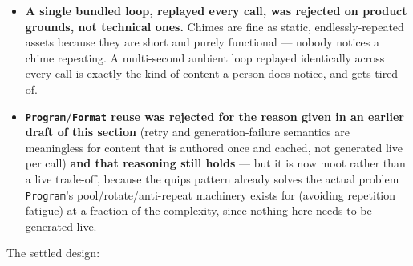 \documentclass[a4paper,11pt]{report}
\begin{document}
\begin{itemize}
  \item \textbf{A single bundled loop, replayed every call, was rejected
    on product grounds, not technical ones.} Chimes are fine as static,
    endlessly-repeated assets because they are short and purely
    functional --- nobody notices a chime repeating. A multi-second
    ambient loop replayed identically across every call is exactly the
    kind of content a person does notice, and gets tired of.
  \item \textbf{\texttt{Program}/\texttt{Format} reuse was rejected for
    the reason given in an earlier draft of this section} (retry and
    generation-failure semantics are meaningless for content that is
    authored once and cached, not generated live per call) \textbf{and
    that reasoning still holds} --- but it is now moot rather than a live
    trade-off, because the quips pattern already solves the actual
    problem \texttt{Program}'s pool/rotate/anti-repeat machinery exists
    for (avoiding repetition fatigue) at a fraction of the complexity,
    since nothing here needs to be generated live.
\end{itemize}

The settled design:
\end{document}
